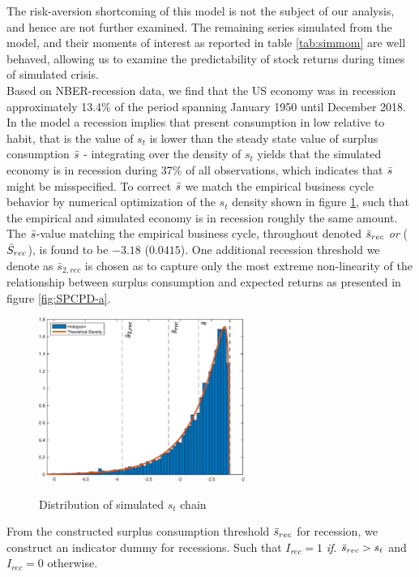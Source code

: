 The risk-aversion shortcoming of this model is not the subject of our analysis, and hence are not further examined. The remaining series simulated from the model, and their moments of interest as reported in table \ref{tab:simmom} are well behaved, allowing us to examine the predictability of stock returns during times of simulated crisis.
\newline
\\
Based on NBER-recession data, we find that the US economy was in recession approximately 13.4\% of the period spanning January 1950 until December 2018.  In the model a recession implies that present consumption in low relative to habit, that is the value of $s_t$ is lower than the steady state value of surplus consumption $\Bar{s}$ - integrating over the density of $s_t$ yields that the simulated economy is in recession during 37\% of all observations, which indicates that $\Bar{s}$ might be misspecified. To correct $\Bar{s}$ we match the empirical business cycle behavior by numerical optimization of the $s_t$ density shown in figure \ref{fig:DistriSt}, such that the empirical and simulated economy is in recession roughly the same amount. The $\Bar{s}$-value matching the empirical business cycle, throughout denoted $\Bar{s}_{rec}$ \textit{or} ($\Bar{S}_{rec}$), is found to be $-3.18$ ($0.0415$). One additional recession threshold we denote as $\bar{s}_{2,rec}$ is chosen as to capture only the most extreme non-linearity of the relationship between surplus consumption and expected returns as presented in figure \ref{fig:SPCPD-a}.





\begin{figure}[H]
    \centering
    \captionsetup{width=0.6\textwidth}
    \caption{Distribution of simulated $s_t$ chain}
    \includegraphics[width=0.6\textwidth]{Figures/DistributionS_t.eps}
    \label{fig:DistriSt}
\end{figure}
From the constructed surplus consumption threshold $\Bar{s}_{rec}$ for recession, we construct an indicator dummy for recessions. Such that $I_{rec} = 1$ \textit{if}. $\Bar{s}_{rec} > s_t$ and $I_{rec}=0$ otherwise.


